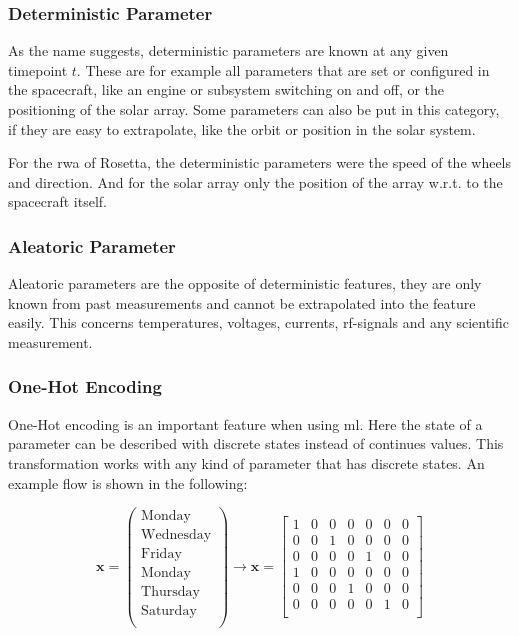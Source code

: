		\subsubsection{Deterministic Parameter}
		As the name suggests, deterministic parameters are known at any given timepoint $t$. These are for example all parameters that are set or configured in the spacecraft, like an engine or subsystem switching on and off, or the positioning of the solar array. \newline
		Some parameters can also be put in this category, if they are easy to extrapolate, like the orbit or position in the solar system.
		
		For the \ac{rwa} of Rosetta, the deterministic parameters were the speed of the wheels and direction. And for the solar array only the position of the array w.r.t. to the spacecraft itself.
		
		\subsubsection{Aleatoric Parameter}
		Aleatoric parameters are the opposite of deterministic features, they are only known from past measurements and cannot be extrapolated into the feature easily. This concerns temperatures, voltages, currents, rf-signals and any scientific measurement.
		
		\subsubsection{One-Hot Encoding}
		One-Hot encoding is an important feature when using \ac{ml}. Here the state of a parameter can be described with discrete states instead of continues values. This transformation works with any kind of parameter that has discrete states. An example flow is shown in the following:

		\begin{equation*}
		\mathbf{x} = \begin{pmatrix}
		\text{Monday} \\
		\text{Wednesday} \\
		\text{Friday} \\
		\text{Monday} \\
		\text{Thursday} \\
		\text{Saturday} \\
		\end{pmatrix} \rightarrow
		\mathbf{x} = \begin{bmatrix}
		1 & 0 & 0 & 0 & 0 & 0 & 0 \\
		0 & 0 & 1 & 0 & 0 & 0 & 0 \\
		0 & 0 & 0 & 0 & 1 & 0 & 0 \\
		1 & 0 & 0 & 0 & 0 & 0 & 0 \\
		0 & 0 & 0 & 1 & 0 & 0 & 0 \\
		0 & 0 & 0 & 0 & 0 & 1 & 0 \\
		\end{bmatrix}
		\end{equation*}				
		
